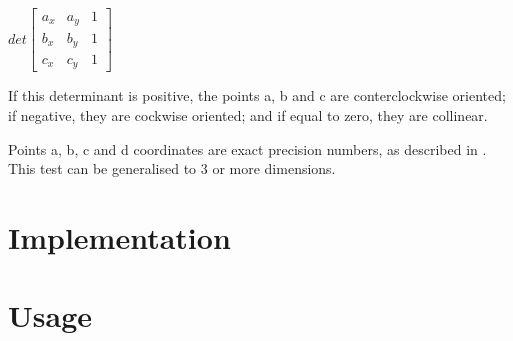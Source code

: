 \documentclass{InsightArticle}
\begin{document}
\begin{math}
det
\begin{bmatrix}
a_x & a_y & 1 \\
b_x & b_y & 1 \\
c_x & c_y & 1
\end{bmatrix}
\end{math}

If this determinant is positive, the points a, b and c are conterclockwise
oriented; if negative, they are cockwise oriented; and if equal to zero, they
are collinear.

Points a, b, c and d coordinates are exact precision numbers, as described in
\cite{shewchuk97a}. This test can be generalised to 3 or more dimensions.

\section{Implementation}

\section{Usage}



\end{document}
